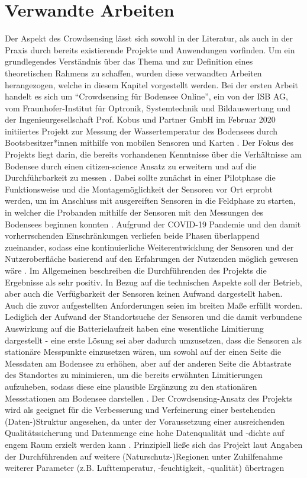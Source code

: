 \section{Verwandte Arbeiten}
\label{sec:related_work}
Der Aspekt des Crowdsensing lässt sich sowohl in der Literatur, als auch in der Praxis durch bereits existierende Projekte und Anwendungen vorfinden. Um ein grundlegendes Verständnis über das Thema und zur Definition eines theoretischen Rahmens zu schaffen, wurden diese verwandten Arbeiten herangezogen, welche in diesem Kapitel vorgestellt werden. \newline Bei der ersten Arbeit handelt es sich um \enquote{Crowdsensing für Bodensee Online}, ein von der ISB AG, vom Fraunhofer-Institut für Optronik, Systemtechnik und Bildauswertung und der Ingenieurgesellschaft Prof. Kobus und Partner GmbH im Februar 2020 initiiertes Projekt zur Messung der Wassertemperatur des Bodensees durch Bootsbesitzer*innen mithilfe von mobilen Sensoren und Karten \cite {Ministerium2021}. Der Fokus des Projekts liegt darin, die bereits vorhandenen Kenntnisse über die Verhältnisse am Bodensee durch einen citizen-science Ansatz zu erweitern und auf die Durchführbarkeit zu messen \cite{Bodensee2021}. Dabei sollte zunächst in einer Pilotphase die Funktionsweise und die Montagemöglichkeit der Sensoren vor Ort erprobt werden, um im Anschluss mit ausgereiften Sensoren in die Feldphase zu starten, in welcher die Probanden mithilfe der Sensoren mit den Messungen des Bodensees beginnen konnten \cite{Bodensee2021}. Aufgrund der COVID-19 Pandemie und den damit vorherrschenden Einschränkungen verliefen beide Phasen überlappend zueinander, sodass eine kontinuierliche Weiterentwicklung der Sensoren und der Nutzeroberfläche basierend auf den Erfahrungen der Nutzenden möglich gewesen wäre \cite{Bodensee2021}. Im Allgemeinen beschreiben die Durchführenden des Projekts die Ergebnisse als sehr positiv. \newline In Bezug auf die technischen Aspekte soll der Betrieb, aber auch die Verfügbarkeit der Sensoren keinen Aufwand dargestellt haben. Auch die zuvor aufgestellten Anforderungen seien im breiten Maße erfüllt worden. Lediglich der Aufwand der Standortsuche der Sensoren und die damit verbundene Auswirkung auf die Batterielaufzeit haben eine wesentliche Limitierung dargestellt - eine erste Lösung sei aber dadurch umzusetzen, dass die Sensoren als stationäre Messpunkte einzusetzen wären, um sowohl auf der einen Seite die Messdaten am Bodensee zu erhöhen, aber auf der anderen Seite die Abtastrate des Standortes zu minimieren, um die bereits erwähnten Limitierungen aufzuheben, sodass diese eine plausible Ergänzung zu den stationären Messstationen am Bodensee darstellen \cite{Bodensee2021}. Der Crowdsensing-Ansatz des Projekts wird als geeignet für die Verbesserung und Verfeinerung einer bestehenden (Daten-)Struktur angesehen, da unter der Voraussetzung einer ausreichenden Qualitätssicherung und Datenmenge eine hohe Datenqualität und -dichte auf engem Raum erzielt werden kann \cite{Bodensee2021}. Prinzipiell ließe sich das Projekt laut Angaben der Durchführenden auf weitere (Naturschutz-)Regionen unter Zuhilfenahme weiterer Parameter (z.B. Lufttemperatur, -feuchtigkeit, -qualität) übertragen 